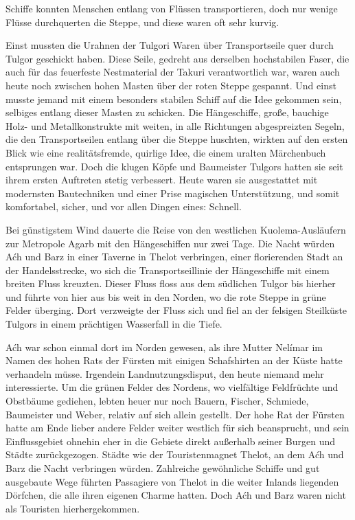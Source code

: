 Schiffe konnten Menschen entlang von Flüssen transportieren, doch nur wenige Flüsse durchquerten die Steppe, und diese waren oft sehr kurvig.

Einst mussten die Urahnen der Tulgori Waren über Transportseile quer durch Tulgor geschickt haben. Diese Seile, gedreht aus derselben hochstabilen Faser, die auch für das feuerfeste Nestmaterial der Takuri verantwortlich war, waren auch heute noch zwischen hohen Masten über der roten Steppe gespannt. Und einst musste jemand mit einem besonders stabilen Schiff auf die Idee gekommen sein, selbiges entlang dieser Masten zu schicken. Die Hängeschiffe, große, bauchige Holz- und Metallkonstrukte mit weiten, in alle Richtungen abgespreizten Segeln, die den Transportseilen entlang über die Steppe huschten, wirkten auf den ersten Blick wie eine realitätsfremde, quirlige Idee, die einem uralten Märchenbuch entsprungen war. Doch die klugen Köpfe und Baumeister Tulgors hatten sie seit ihrem ersten Auftreten stetig verbessert. Heute waren sie ausgestattet mit modernsten Bautechniken und einer Prise magischen Unterstützung, und somit komfortabel, sicher, und vor allen Dingen eines: Schnell.

Bei günstigstem Wind dauerte die Reise von den westlichen Kuolema-Ausläufern zur Metropole Agarb mit den Hängeschiffen nur zwei Tage. Die Nacht würden Aćh und Barz in einer Taverne in Thelot verbringen, einer florierenden Stadt an der Handelsstrecke, wo sich die Transportseillinie der Hängeschiffe mit einem breiten Fluss kreuzten. Dieser Fluss floss aus dem südlichen Tulgor bis hierher und führte von hier aus bis weit in den Norden, wo die rote Steppe in grüne Felder überging. Dort verzweigte der Fluss sich und fiel an der felsigen Steilküste Tulgors in einem prächtigen Wasserfall in die Tiefe.

Aćh war schon einmal dort im Norden gewesen, als ihre Mutter Nelímar im Namen des hohen Rats der Fürsten mit einigen Schafshirten an der Küste hatte verhandeln müsse. Irgendein Landnutzungsdisput, den heute niemand mehr interessierte. Um die grünen Felder des Nordens, wo vielfältige Feldfrüchte und Obstbäume gediehen, lebten heuer nur noch Bauern, Fischer, Schmiede, Baumeister und Weber, relativ auf sich allein gestellt. Der hohe Rat der Fürsten hatte am Ende lieber andere Felder weiter westlich für sich beansprucht, und sein Einflussgebiet ohnehin eher in die Gebiete direkt außerhalb seiner Burgen und Städte zurückgezogen. Städte wie der Touristenmagnet Thelot, an dem Aćh und Barz die Nacht verbringen würden. Zahlreiche gewöhnliche Schiffe und gut ausgebaute Wege führten Passagiere von Thelot in die weiter Inlands liegenden Dörfchen, die alle ihren eigenen Charme hatten. Doch Aćh und Barz waren nicht als Touristen hierhergekommen.\bigskip







